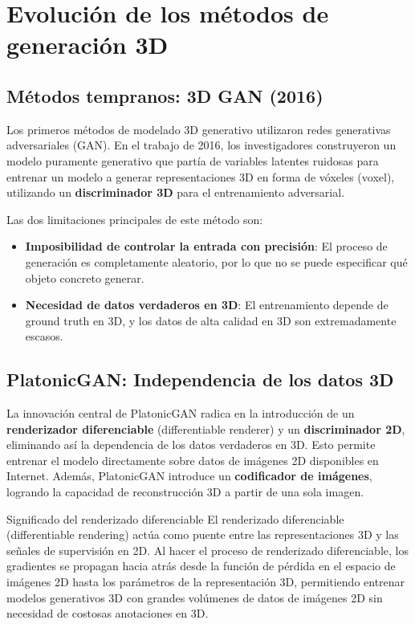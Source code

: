 \section{Evolución de los métodos de generación 3D}

\subsection{Métodos tempranos: 3D GAN (2016)}

Los primeros métodos de modelado 3D generativo utilizaron redes generativas adversariales (GAN). En el trabajo de 2016, los investigadores construyeron un modelo puramente generativo que partía de variables latentes ruidosas para entrenar un modelo a generar representaciones 3D en forma de vóxeles (voxel), utilizando un \textbf{discriminador 3D} para el entrenamiento adversarial.

Las dos limitaciones principales de este método son:
\begin{itemize}
    \item \textbf{Imposibilidad de controlar la entrada con precisión}: El proceso de generación es completamente aleatorio, por lo que no se puede especificar qué objeto concreto generar.
    \item \textbf{Necesidad de datos verdaderos en 3D}: El entrenamiento depende de ground truth en 3D, y los datos de alta calidad en 3D son extremadamente escasos.
\end{itemize}

\subsection{PlatonicGAN: Independencia de los datos 3D}

La innovación central de PlatonicGAN radica en la introducción de un \textbf{renderizador diferenciable} (differentiable renderer) y un \textbf{discriminador 2D}, eliminando así la dependencia de los datos verdaderos en 3D. Esto permite entrenar el modelo directamente sobre datos de imágenes 2D disponibles en Internet. Además, PlatonicGAN introduce un \textbf{codificador de imágenes}, logrando la capacidad de reconstrucción 3D a partir de una sola imagen.

\begin{knowledgebox}{Significado del renderizado diferenciable}
El renderizado diferenciable (differentiable rendering) actúa como puente entre las representaciones 3D y las señales de supervisión en 2D. Al hacer el proceso de renderizado diferenciable, los gradientes se propagan hacia atrás desde la función de pérdida en el espacio de imágenes 2D hasta los parámetros de la representación 3D, permitiendo entrenar modelos generativos 3D con grandes volúmenes de datos de imágenes 2D sin necesidad de costosas anotaciones en 3D.
\end{knowledgebox}

